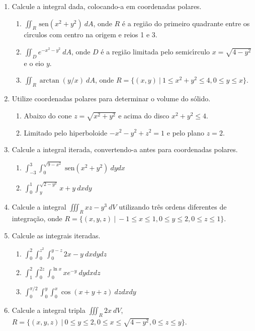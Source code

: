 \documentclass[a4paper,5pt]{amsbook}
\newcommand{\sen}{\,\mbox{sen}}
\newcommand{\ds}{\displaystyle}
\begin{document}
\vspace{1cm}
\begin{enumerate}
    \setlength\itemsep{0.5cm}
    \item Calcule a integral dada, colocando-a em coordenadas polares.
        \begin{enumerate}
            \setlength\itemsep{0.3cm}
            \item $\ds\iint_R \sen{(x^2+y^2)}\ dA$, onde $R$ \'e a regi\~ao do
            primeiro quadrante entre os c\'{\i}rculos com centro na origem e reios 1
            e 3.
            \item $\ds\iint_D e^{-x^2-y^2}\ dA$, onde $D$ \'e a regi\~ao limitada
            pelo semic\'{\i}rculo $x=\sqrt{4-y^2}$ e o eio $y$.
            \item $\ds\iint_R \arctan{(y/x)}\ dA$, onde $R=\{(x,y)\ |\ 1\le
            x^2+y^2\le 4, 0\le y\le x\}$.
        \end{enumerate}

    \item Utilize coordenadas polares para determinar o volume do s\'olido.
        \begin{enumerate}
            \setlength\itemsep{0.3cm}
            \item Abaixo do cone $z=\sqrt{x^2+y^2}$ e acima do disco
            $x^2+y^2\le 4$.
            \item Limitado pelo hiperboloide $-x^2-y^2+z^2=1$ e pelo plano
            $z=2$.
        \end{enumerate}

    \item Calcule a integral iterada, convertendo-a antes para coordenadas
    polares.
        \begin{enumerate}
            \setlength\itemsep{0.3cm}
            \item $\ds\int_{-3}^{3} \int_0^{\sqrt{9-x^2}} \sen{(x^2+y^2)}\ dydx$
            \item $\ds\int_0^1 \int_y^{\sqrt{2-y^2}} x+y\ dxdy$
        \end{enumerate}

    \item Calcule a integral $\ds\iiint_R xz-y^3\ dV$ utilizando tr\^es ordens
    diferentes de integra\c{c}\~ao, onde $R=\{(x,y,z)\ |\ -1\le x\le 1, 0\le y\le 2,
    0\le z\le 1\}$.

    \item Calcule as integrais iteradas.
        \begin{enumerate}
            \setlength\itemsep{0.3cm}
            \item $\ds\int_0^2 \int_0^{z^2} \int_0^{y-z} 2x-y\ dxdydz$
            \item $\ds\int_1^2 \int_0^{2z} \int_0^{\ln{x}} xe^{-y}\ dydxdz$
            \item $\ds\int_0^{\pi/2} \int_0^y \int_0^x \cos{(x+y+z)}\ dzdxdy$
        \end{enumerate}

    \item Calcule a integral tripla $\ds\iiint_R 2x\ dV$, $R=\{(x,y,z)\ |\ 0\le
    y\le 2, 0\le x\le \sqrt{4-y^2}, 0\le z\le y\}$.
\end{enumerate}
\end{document}
